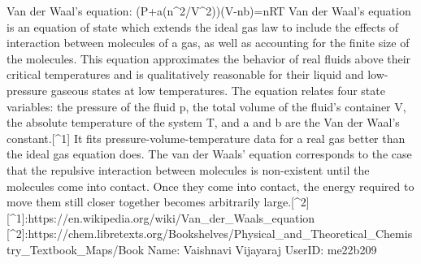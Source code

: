Van der Waal's equation:
(P+a(n^2/V^2))(V-nb)=nRT
Van der Waal's equation is an equation of state which extends the ideal gas law to include the effects of interaction between molecules of a gas, as well as accounting for the finite size of the molecules.
This equation approximates the behavior of real fluids above their critical temperatures and is qualitatively reasonable for their liquid and low-pressure gaseous states at low temperatures.
The equation relates four state variables: the pressure of the fluid p, the total volume of the fluid's container V, the absolute temperature of the system T, and a and b are the Van der Waal's constant.[^1]
It fits pressure-volume-temperature data for a real gas better than the ideal gas equation does.
The van der Waals’ equation corresponds to the case that the repulsive interaction between molecules is non-existent until the molecules come into contact. 
Once they come into contact, the energy required to move them still closer together becomes arbitrarily large.[^2]
[^1]:https://en.wikipedia.org/wiki/Van_der_Waals_equation
[^2]:https://chem.libretexts.org/Bookshelves/Physical_and_Theoretical_Chemistry_Textbook_Maps/Book%
Name: Vaishnavi Vijayaraj
UserID: me22b209
